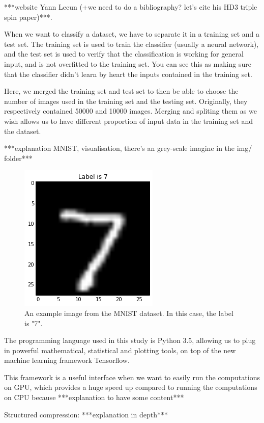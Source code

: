 \documentclass[11pt,a4paper]{article}
\begin{document}
	
	***website Yann Lecun (+we need to do a bibliography? let's cite his HD3 triple spin paper)***.
	
	
	When we want to classify a dataset, we have to separate it in a training set and a test set. The training set is used to train the classifier (usually a neural network), and the test set is used to verify that the classification is working for general input, and is not overfitted to the training set. You can see this as making sure that the classifier didn't learn by heart the inputs contained in the training set.
	
	
	Here, we merged the training set and test set to then be able to choose the number of images used in the training set and the testing set. Originally, they respectively contained 50000 and 10000 images. Merging and spliting them as we wish allows us to have different proportion of input data in the training set and the dataset.
	
	
	***explanation MNIST, visualisation, there's an grey-scale imagine in the img/ folder***
	\begin{figure}
		\centering
		\includegraphics[scale=0.7]{img/gYsJp.png}
		\caption{An example image from the MNIST dataset. In this case, the label is "7".}
		\label{img:example_mnist_img}
	\end{figure}
	
	The programming language used in this study is Python 3.5, allowing us to plug in powerful mathematical, statistical and plotting tools, on top of the new machine learning framework Tensorflow.
	
	
	This framework is a useful interface when we want to easily run the computations on GPU, which provides a huge speed up compared to running the computations on CPU because ***explanation to have some content***
	
	Structured compression:
	***explanation in depth***
	
\end{document}
